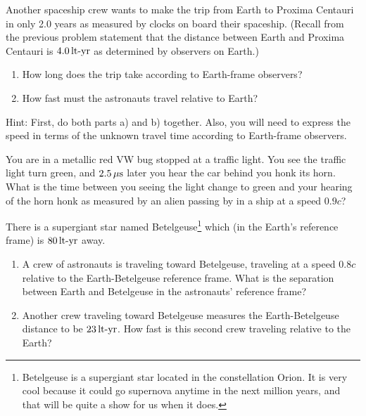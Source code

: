 \begin{problem}
Another spaceship crew wants to make the trip from Earth to
Proxima Centauri in only 2.0 years as measured by clocks on board their
spaceship.  (Recall from the previous problem statement that the 
distance between Earth and Proxima Centauri is $4.0\,\mbox{lt-yr}$ 
as determined by observers on Earth.) 
    \begin{enumerate}
    \item How long does the trip take according to Earth-frame observers?
    \item How fast must the astronauts travel relative to Earth? 
    \end{enumerate}
Hint: First, do both parts a) and b) together.  Also, you will need
to express the speed in terms of the unknown travel time according to
Earth-frame observers.  
\label{prob:alpha_centauri2}
\end{problem}

\begin{problem}
You are in a metallic red VW bug stopped at a traffic light.
You see the traffic light turn green, and $2.5\,\mbox{$\mu$s}$ later you hear
the car behind you honk its horn.  What is the time between you 
seeing the light change to green and your hearing of the horn honk 
as measured by an 
alien passing by in a ship at a speed $0.9c$?
\end{problem}

\begin{problem}
There is a supergiant star named Betelgeuse\footnote{Betelgeuse
is a supergiant star located in the constellation Orion.  It is very
cool because it could go supernova anytime in the next million years,
and that will be quite a show for us when it does.} which (in the
Earth's reference frame) is $80\,\mbox{lt-yr}$ away.  
    \begin{enumerate}
    \item A crew of astronauts is traveling toward Betelgeuse,
    traveling at a speed $0.8c$ relative to the Earth-Betelgeuse
    reference frame.  What is the separation between Earth and
    Betelgeuse in the astronauts' reference frame?
    \item Another crew traveling toward Betelgeuse measures the
    Earth-Betelgeuse distance to be $23\,\mbox{lt-yr}$.  How fast is this 
    second crew traveling relative to the Earth?
    \end{enumerate}
\label{prob:betelgeuse}
\end{problem}

